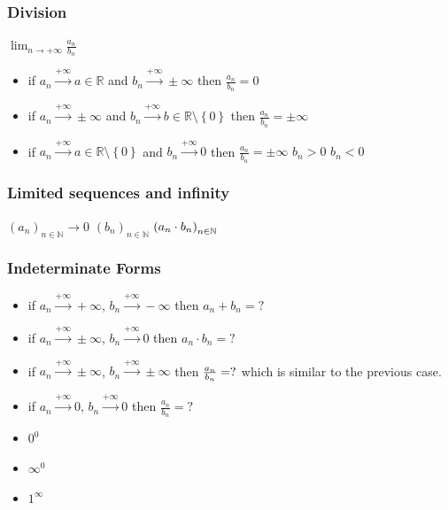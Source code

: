 \documentclass[a4paper]{report}
\begin{document}
\subsubsection{\textbf{Division}}
 $ \lim_{n \to + \infty} \frac{a_{n}}{b_{n}}  $
\begin{itemize}
    \item if $a_{n}\overset{+\infty}{\rightarrow}a\in\mathbb{R}$ and $b_{n}\overset{+\infty}{\rightarrow}\pm\infty$ then $\frac{a_{n}}{b_{n}} = 0$
    \item if $a_{n}\overset{+\infty}{\rightarrow}\pm\infty$ and $b_{n}\overset{+\infty}{\rightarrow}b\in\mathbb{R}\setminus \left \{ 0 \right \}$ then $\frac{a_{n}}{b_{n}} = \pm\infty$
    \item if $a_{n}\overset{+\infty}{\rightarrow}a\in\mathbb{R}\setminus \left \{ 0 \right \} $ and $b_{n}\overset{+\infty}{\rightarrow}0$ then $\frac{a_{n}}{b_{n}} = \pm\infty$ \text{ (} $b_{n}>0$  $b_{n}<0$ \text{)}
\end{itemize}
\subsubsection{\textbf{Limited sequences and infinity}}
 $ \left ( a_{n} \right )_{n\in\mathbb{N}} \rightarrow 0 $  $\left ( b_{n} \right )_{n\in\mathbb{N}}$  $\left ( a_{n}\cdot b_{n} \right )_{n\in\mathbb{N}}\\$ 
\subsubsection{\textbf{Indeterminate Forms}}
\begin{itemize}
    \item if $a_{n}\overset{+\infty}{\rightarrow}+\infty$, $b_{n}\overset{+\infty}{\rightarrow}-\infty$ then $a_{n} + b_{n} = ?$
    \item if $a_{n}\overset{+\infty}{\rightarrow}\pm\infty$, $b_{n}\overset{+\infty}{\rightarrow}0$ then $a_{n} \cdot b_{n} = ?$
    \item if $a_{n}\overset{+\infty}{\rightarrow}\pm\infty$, $b_{n}\overset{+\infty}{\rightarrow}\pm\infty$ then $\frac{a_{n}}{b_{n}} = ?\\$ which is similar to the previous case.
    \item if $a_{n}\overset{+\infty}{\rightarrow}0$, $b_{n}\overset{+\infty}{\rightarrow}0$ then $\frac{a_{n}}{b_{n}} = ?$
    \item $0^{0}$
    \item $\infty^{0}$
    \item $1^{\infty}$
\end{itemize}
\end{document}
